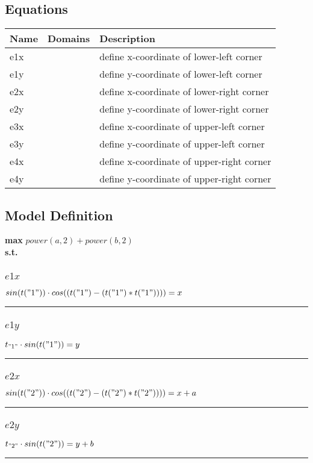 \documentclass[11pt]{article}
\begin{document}
\subsection*{Equations}
\begin{tabularx}{\textwidth}{| l | l | X |}
\hline
\textbf{Name} & \textbf{Domains} & \textbf{Description}\\
\hline
\endhead

e1x &  & define x-coordinate of lower-left corner\\
e1y &  & define y-coordinate of lower-left corner\\
e2x &  & define x-coordinate of lower-right corner\\
e2y &  & define y-coordinate of lower-right corner\\
e3x &  & define x-coordinate of upper-left corner\\
e3y &  & define y-coordinate of upper-left corner\\
e4x &  & define x-coordinate of upper-right corner\\
e4y &  & define y-coordinate of upper-right corner\\
\hline
\end{tabularx}
\subsection*{Model Definition}
\textbf{max} $ power(a,2)  +  power(b,2) $\\
\textbf{s.t.}
\subsubsection*{$e1x$}
$
 sin(t("1"))  \cdot  cos((t("1") - (t("1") * t("1"))))  = x
$
\vspace{5pt}
\hrule
\subsubsection*{$e1y$}
$
t_{"1"} \cdot  sin(t("1"))  = y
$
\vspace{5pt}
\hrule
\subsubsection*{$e2x$}
$
 sin(t("2"))  \cdot  cos((t("2") - (t("2") * t("2"))))  = x + a
$
\vspace{5pt}
\hrule
\subsubsection*{$e2y$}
$
t_{"2"} \cdot  sin(t("2"))  = y + b
$
\vspace{5pt}
\hrule
\end{document}
